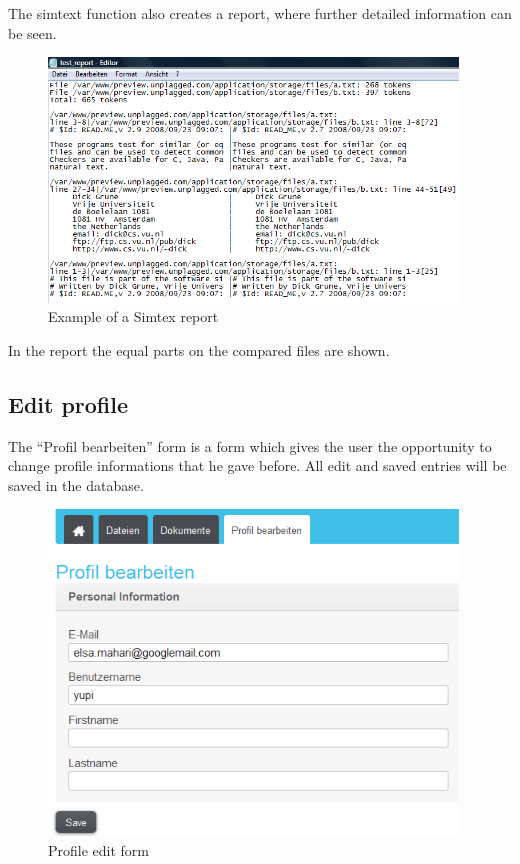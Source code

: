 The simtext function also creates a report, where further detailed information can be seen.

\begin{figure}[!ht]
  \centering
    \includegraphics[width=0.97\textwidth]{images/basic_functionalities/simtext_report.png}
  \caption{Example of a Simtex report}
  \label{fig:example simtex report}
\end{figure}

In the report the equal parts on the compared files are shown.

\subsection{Edit profile}

The \enquote{Profil bearbeiten} form is a form which gives the user the opportunity to change profile informations that 
he gave before. All edit and saved entries will be saved in the database.

\begin{figure}[!ht]
  \centering
    \includegraphics[width=0.97\textwidth]{images/basic_functionalities/edit_profile.png}
  \caption{Profile edit form}
  \label{fig: profile edit form}
\end{figure}

